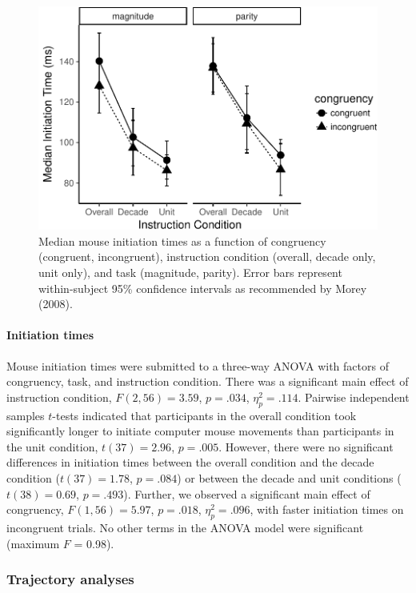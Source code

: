 \documentclass[english,man]{apa6}
\theoremstyle{definition}
\theoremstyle{definition}
\theoremstyle{definition}
\theoremstyle{remark}
\begin{document}
\begin{figure}
\centering
\includegraphics{paper_files/figure-latex/exp2-init-1.pdf}
\caption{\label{fig:exp2-init}Median mouse initiation times as a function of
congruency (congruent, incongruent), instruction condition (overall,
decade only, unit only), and task (magnitude, parity). Error bars
represent within-subject 95\% confidence intervals as recommended by
Morey (2008).}
\end{figure}

\paragraph{Initiation times}\label{initiation-times}

Mouse initiation times were submitted to a three-way ANOVA with factors
of congruency, task, and instruction condition. There was a significant
main effect of instruction condition, \(F(2, 56) = 3.59\), \(p = .034\),
\(\eta^2_p = .114\). Pairwise independent samples \(t\)-tests indicated
that participants in the overall condition took significantly longer to
initiate computer mouse movements than participants in the unit
condition, \(t(37) = 2.96\), \(p = .005\). However, there were no
significant differences in initiation times between the overall
condition and the decade condition (\(t(37) = 1.78\), \(p = .084\)) or
between the decade and unit conditions (\(t(38) = 0.69\), \(p = .493\)).
Further, we observed a significant main effect of congruency,
\(F(1, 56) = 5.97\), \(p = .018\), \(\eta^2_p = .096\), with faster
initiation times on incongruent trials. No other terms in the ANOVA
model were significant (maximum \(F\) = 0.98).

\subsubsection{Trajectory analyses}\label{trajectory-analyses}
\end{document}
